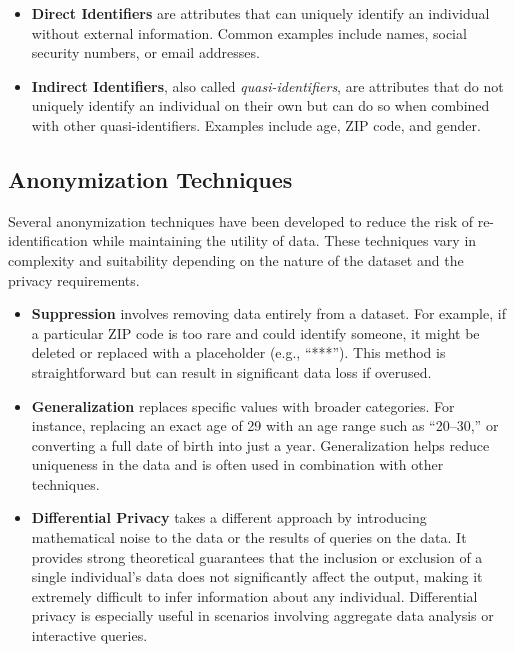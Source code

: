 \documentclass{article}
\begin{document}
\begin{itemize}
\item \textbf{Direct Identifiers} are attributes that can uniquely identify an individual without external information. Common examples include names, social security numbers, or email addresses.

\item \textbf{Indirect Identifiers}, also called \textit{quasi-identifiers}, are attributes that do not uniquely identify an individual on their own but can do so when combined with other quasi-identifiers. Examples include age, ZIP code, and gender.
\end{itemize}




\subsection{Anonymization Techniques}

Several anonymization techniques have been developed to reduce the risk of re-identification while maintaining the utility of data. These techniques vary in complexity and suitability depending on the nature of the dataset and the privacy requirements.

\begin{itemize}
\item \textbf{Suppression} involves removing data entirely from a dataset. For example, if a particular ZIP code is too rare and could identify someone, it might be deleted or replaced with a placeholder (e.g., “***”). This method is straightforward but can result in significant data loss if overused.

\item \textbf{Generalization} replaces specific values with broader categories. For instance, replacing an exact age of 29 with an age range such as “20–30,” or converting a full date of birth into just a year. Generalization helps reduce uniqueness in the data and is often used in combination with other techniques.

\item \textbf{Differential Privacy} takes a different approach by introducing mathematical noise to the data or the results of queries on the data. It provides strong theoretical guarantees that the inclusion or exclusion of a single individual’s data does not significantly affect the output, making it extremely difficult to infer information about any individual. Differential privacy is especially useful in scenarios involving aggregate data analysis or interactive queries.

\end{itemize}
\end{document}
